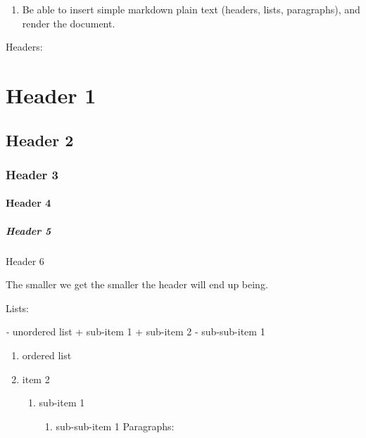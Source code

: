\documentclass[
  letterpaper,
  DIV=11,
  numbers=noendperiod]{scrartcl}
\let\oldparagraph\paragraph
\renewcommand{\paragraph}[1]{\oldparagraph{#1}\mbox{}}
\let\oldsubparagraph\subparagraph
\renewcommand{\subparagraph}[1]{\oldsubparagraph{#1}\mbox{}}
\providecommand{\tightlist}{%
  \setlength{\itemsep}{0pt}\setlength{\parskip}{0pt}}\usepackage{longtable,booktabs,array}
\begin{document}
\begin{enumerate}
\def\labelenumi{\arabic{enumi}.}
\setcounter{enumi}{3}
\tightlist
\item
  Be able to insert simple markdown plain text (headers, lists,
  paragraphs), and render the document.
\end{enumerate}

Headers:

\hypertarget{header-1}{%
\section{Header 1}\label{header-1}}

\hypertarget{header-2}{%
\subsection{Header 2}\label{header-2}}

\hypertarget{header-3}{%
\subsubsection{Header 3}\label{header-3}}

\hypertarget{header-4}{%
\paragraph{Header 4}\label{header-4}}

\hypertarget{header-5}{%
\subparagraph{Header 5}\label{header-5}}

Header 6

The smaller we get the smaller the header will end up being.

Lists:

\emph{-} unordered list + sub-item 1 + sub-item 2 - sub-sub-item 1

\begin{enumerate}
\def\labelenumi{\arabic{enumi}.}
\tightlist
\item
  ordered list
\item
  item 2

  \begin{enumerate}
  \def\labelenumii{\roman{enumii})}
  \tightlist
  \item
    sub-item 1

    \begin{enumerate}
    \def\labelenumiii{\Alph{enumiii}.}
    \tightlist
    \item
      sub-sub-item 1 Paragraphs:
    \end{enumerate}
  \end{enumerate}
\end{enumerate}
\end{document}
